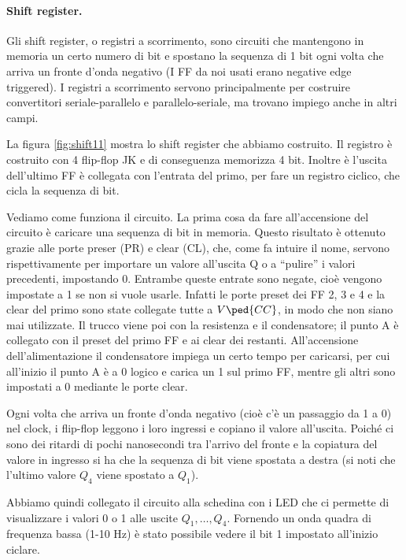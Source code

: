 \paragraph{Shift register.}

Gli shift register, o registri a scorrimento, sono circuiti che mantengono in memoria un certo numero di bit
e spostano la sequenza di 1 bit ogni volta che arriva un fronte d'onda negativo (I FF da noi usati erano negative edge triggered).
I registri a scorrimento
servono principalmente per costruire convertitori seriale-parallelo e parallelo-seriale, ma trovano
impiego anche in altri campi.


La figura \ref{fig:shift11} mostra lo shift register che abbiamo costruito. Il registro
è costruito con 4 flip-flop JK e di conseguenza memorizza 4 bit. Inoltre è l'uscita dell'ultimo FF
è collegata con l'entrata del primo, per fare un registro ciclico, che cicla la sequenza di bit.

Vediamo come funziona il circuito. La prima cosa da fare all'accensione del circuito è caricare
una sequenza di bit in memoria. Questo risultato è ottenuto grazie alle porte preser (PR) e clear (CL),
che, come fa intuire il nome, servono rispettivamente per importare un valore all'uscita Q o a
``pulire'' i valori precedenti, impostando 0. Entrambe queste entrate sono negate, cioè vengono impostate
a 1 se non si vuole usarle. Infatti le porte preset dei FF 2, 3 e 4 e la clear del primo sono
state collegate tutte a $V\ped{CC}$, in modo che non siano mai utilizzate. Il trucco viene poi con
la resistenza e il condensatore; il punto A è collegato con il preset del primo FF
e ai clear dei restanti. All'accensione dell'alimentazione il condensatore impiega un certo
tempo per caricarsi, per cui all'inizio il punto A è a 0 logico e carica un 1 sul primo FF,
mentre gli altri sono impostati a 0 mediante le porte clear.

Ogni volta che arriva un fronte d'onda negativo (cioè c'è un passaggio da 1 a 0) nel clock,
i flip-flop leggono i loro ingressi e copiano il valore all'uscita. Poiché ci sono
dei ritardi di pochi nanosecondi tra l'arrivo del fronte e la copiatura del valore in ingresso
si ha che la sequenza di bit viene spostata a destra (si noti che l'ultimo valore $Q_4$ viene spostato
a $Q_1$).

Abbiamo quindi collegato il circuito alla schedina con i LED che ci permette di visualizzare i valori
0 o 1 alle uscite $Q_1,\dots,Q_4$. Fornendo un onda quadra di frequenza bassa (1-10 Hz) è stato possibile
vedere il bit 1 impostato all'inizio ciclare.

